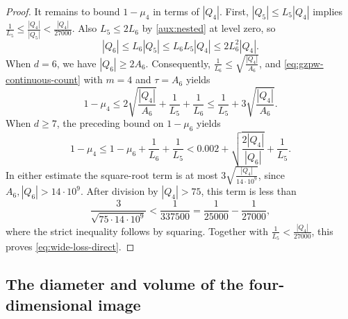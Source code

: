 \documentclass[reqno, 11pt]{article}
\numberwithin{equation}{section}
\theoremstyle{definition}
\begin{document}
\begin{proof}
It remains to bound $1-\mu_4$ in terms of $|Q_4|$. First,
$|Q_5|\le L_5|Q_4|$ implies
$\frac{1}{L_5}\le\frac{|Q_4|}{|Q_5|}<\frac{|Q_4|}{27000}$.
Also $L_5\le2L_6$ by \eqref{aux:nested} at level zero, so
\[
 |Q_6|\le L_6|Q_5|\le L_6 L_5|Q_4|\le2L_6^2|Q_4|.
\]
When $d=6$, we have $|Q_6|\ge2A_6$. Consequently,
$\frac{1}{L_6}\le\sqrt{\frac{|Q_4|}{A_6}}$, and
\eqref{eq:gzpw-continuous-count} with $m=4$ and $\tau=A_6$ yields
\[
 1-\mu_4\le2\sqrt{\frac{|Q_4|}{A_6}}+\frac{1}{L_5}+\frac{1}{L_6}
             \le\frac{1}{L_5}+3\sqrt{\frac{|Q_4|}{A_6}} .
\]
When $d\ge7$, the preceding bound on $1-\mu_6$ yields
\[
 1-\mu_4\le1-\mu_6+\frac{1}{L_6}+\frac{1}{L_5}
 <0.002+\sqrt{\frac{2|Q_4|}{|Q_6|}}+\frac{1}{L_5}.
\]
In either estimate the square-root term is at most
$3\sqrt{\frac{|Q_4|}{14\cdot10^9}}$, since $A_6,|Q_6|>14\cdot10^9$.
After division by $|Q_4|>75$, this term is less than
\[
 \frac{3}{\sqrt{75\cdot14\cdot10^9}}<\frac{1}{337500}
                 =\frac{1}{25000}-\frac{1}{27000},
\]
where the strict inequality follows by squaring.
Together with $\frac{1}{L_5}<\frac{|Q_4|}{27000}$, this proves
\eqref{eq:wide-loss-direct}.
\end{proof}

\subsection{The diameter and volume of the four-dimensional image}
\end{document}
